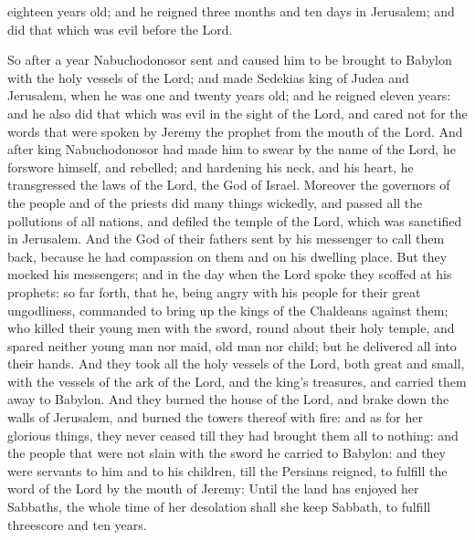 { eighteen years old;
and he reigned three months and ten days in Jerusalem; and did that which was evil before the Lord.
\par }{\PP {}So after a year Nabuchodonosor sent and caused him to be brought to Babylon with the holy vessels of the Lord;
and made Sedekias king of Judea and Jerusalem, when he was one and twenty years old; and he reigned eleven years:
and he also did that which was evil in the sight of the Lord, and cared not for the words that were spoken by Jeremy the prophet from the mouth of the Lord.
And after king Nabuchodonosor had made him to swear by the name of the Lord, he forswore himself, and rebelled; and hardening his neck, and his heart, he transgressed the laws of the Lord, the God of Israel.
Moreover the governors of the people and of the priests did many things wickedly,
 and passed all the pollutions of all nations, and defiled the temple of the Lord, which was sanctified in Jerusalem.
And the God of their fathers sent by his messenger to call them back, because he had compassion on them and on his dwelling place.
But they mocked his messengers; and in the day when the Lord spoke
{} they scoffed at his prophets:
so far forth, that he, being angry with his people for their great ungodliness, commanded to bring up the kings of the Chaldeans against them;
who killed their young men with the sword, round about their holy temple, and spared neither young man nor maid, old man nor child; but he delivered all into their hands.
And they took all the holy vessels of the Lord, both great and small, with
 the vessels of the ark of the Lord, and the king’s treasures, and carried them away to Babylon.
And they burned the house of the Lord, and brake down the walls of Jerusalem, and burned the towers thereof with fire:
and as for her glorious things, they never ceased till they had brought them all to nothing: and the people that were not slain with the sword he carried to Babylon:
and they were servants to him and to his children, till the Persians reigned, to fulfill the word of the Lord by the mouth of Jeremy:
Until the land has enjoyed her Sabbaths, the whole time of her desolation shall she keep Sabbath, to fulfill threescore and ten years.

}
